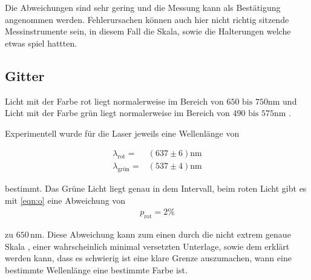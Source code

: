 Die Abweichungen sind sehr gering und die Messung kann als Bestätigung angenommen werden.
Fehlerursachen können auch hier nicht richtig sitzende Messinstrumente sein, in diesem Fall die Skala,
sowie die Halterungen welche etwas spiel hattten.

\subsection{Gitter}
Licht mit der Farbe rot liegt normalerweise im Bereich von $ 650 \text{ bis } 750 \si{\nano\meter}$
und Licht mit der Farbe grün liegt normalerweise im Bereich von $490 \text{ bis } 575 \si{\nano\meter}$ \cite{}.

Experimentell wurde für die Laser jeweils eine Wellenlänge von 

\begin{align*}
\lambda_\text{rot} =& (637 \pm 6) \si{\nano\meter} \\
\lambda_\text{grün} =& (537 \pm 4) \si{\nano\meter} 
\end{align*}

bestimmt. Das Grüne Licht liegt genau in dem Intervall, beim roten Licht gibt es mit \autoref{eqn:o}
eine Abweichung von 
\begin{align*}
    p_\text{rot} = 2 \si{\percent}   
\end{align*}

zu $650 \, \si{\nano\meter}$. Diese Abweichung kann zum einen durch die nicht extrem genaue Skala
, einer wahrscheinlich minimal versetzten Unterlage, sowie
dem erklärt werden kann, dass es schwierig ist eine klare Grenze auszumachen, wann eine bestimmte Wellenlänge
eine bestimmte Farbe ist.
